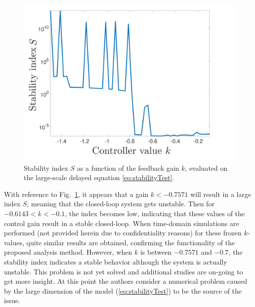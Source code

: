 \documentclass[graybox]{svmult}
\begin{document}
\begin{figure}[!b]
	\sidecaption[]
	\includegraphics[scale=.2]{stabilityAnalysis.pdf}
	\caption{Stability index $S$ as a function of the feedback gain $k$, evaluated on the large-scale delayed equation \eqref{eq:stabilityTest}. }
	\label{fig:stability}	
\end{figure}
With reference to Fig.~\ref{fig:stability}, it appears that a gain $k<-0.7571$ will result in a large index $S$, meaning that the closed-loop system gets unstable. Then for $-0.6143<k<-0.1$, the index becomes low, indicating that these values of the control gain result in a stable closed-loop. When time-domain simulations are performed (not provided herein due to confidentiality reasons) for these frozen $k$-values, quite similar results are obtained, confirming the functionality of the proposed analysis method.
However, when $k$ is  between $-0.7571$ and $-0.7$, the stability index indicates a stable behavior although the system is actually unstable. This problem is not yet solved and additional studies are on-going to get more insight.
At this point the authors consider a numerical problem caused by the large dimension of the model (\ref{eq:stabilityTest})  to be the source of the issue. 

\vspace{-2mm}
\end{document}
